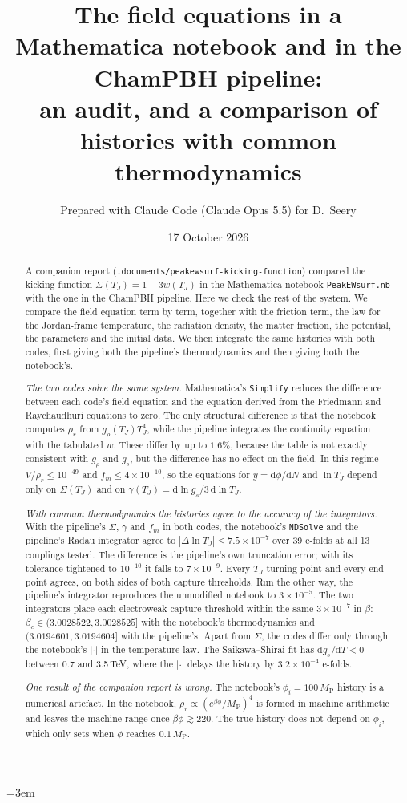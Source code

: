 \documentclass[11pt,a4paper]{article}
\title{The field equations in a Mathematica notebook and in the ChamPBH pipeline:\\
  an audit, and a comparison of histories with common thermodynamics}
\author{Prepared with Claude Code (Claude Opus 5.5) for D.~Seery}
\date{17 October 2026}
\newcommand{\MP}{M_{\mathrm{P}}}
\newcommand{\TJ}{T_{J}}
\newcommand{\code}[1]{\texttt{#1}}
\begin{document}
\emergencystretch=3em
\maketitle

\begin{abstract}
\noindent
A companion report (\code{.documents/peakewsurf-kicking-function}) compared the kicking
function $\Sigma(\TJ) = 1 - 3w(\TJ)$ in the Mathematica notebook \code{PeakEWsurf.nb} with the
one in the ChamPBH pipeline. Here we check the rest of the system. We compare the field
equation term by term, together with the friction term, the law for the Jordan-frame
temperature, the radiation density, the matter fraction, the potential, the parameters and
the initial data. We then integrate the same histories with both codes, first giving both
the pipeline's thermodynamics and then giving both the notebook's.

\emph{The two codes solve the same system.} Mathematica's \code{Simplify} reduces the
difference between each code's field equation and the equation derived from the Friedmann and
Raychaudhuri equations to zero. The only structural difference is that the notebook computes
$\rho_r$ from $g_\rho(\TJ)\TJ^4$, while the pipeline integrates the continuity equation with
the tabulated $w$. These differ by up to $1.6\%$, because the table is not exactly
consistent with $g_\rho$ and $g_s$, but the difference has no effect on the field. In
this regime $V/\rho_r \le 10^{-49}$ and $f_m \le 4\times10^{-10}$, so the equations for $y =
\mathrm{d}\phi/\mathrm{d}N$ and $\ln\TJ$ depend only on $\Sigma(\TJ)$ and on $\gamma(\TJ) =
\mathrm{d}\ln g_s/3\,\mathrm{d}\ln\TJ$.

\emph{With common thermodynamics the histories agree to the accuracy of the integrators.}
With the pipeline's $\Sigma$, $\gamma$ and $f_m$ in both codes, the notebook's \code{NDSolve}
and the pipeline's Radau integrator agree to $|\Delta\ln\TJ| \le 7.5\times10^{-7}$ over
39 e-folds at all 13 couplings tested. The difference is the pipeline's own truncation error;
with its tolerance tightened to $10^{-10}$ it falls to $7\times10^{-9}$. Every $\TJ$ turning
point and every end point agrees, on both sides of both capture thresholds. Run the other way,
the pipeline's integrator reproduces the unmodified notebook to $3\times10^{-5}$. The two
integrators place each electroweak-capture threshold within the same $3\times10^{-7}$ in
$\beta$: $\beta_c \in (3.0028522, 3.0028525]$ with the notebook's thermodynamics and
$(3.0194601, 3.0194604]$ with the pipeline's.
Apart from $\Sigma$, the codes differ only through the notebook's $|\cdot|$ in the
temperature law. The Saikawa--Shirai fit has $\mathrm{d}g_s/\mathrm{d}T < 0$ between 0.7 and
3.5\,TeV, where the $|\cdot|$ delays the history by $3.2\times10^{-4}$ e-folds.

\emph{One result of the companion report is wrong.} The notebook's $\phi_i = 100\,\MP$
history is a numerical artefact. In the notebook, $\rho_r \propto (e^{\beta\phi}/\MP)^4$ is
formed in machine arithmetic and leaves the machine range once $\beta\phi \gtrsim 220$. The
true history does not depend on $\phi_i$, which only sets when $\phi$ reaches $0.1\,\MP$.
\end{abstract}
\end{document}
